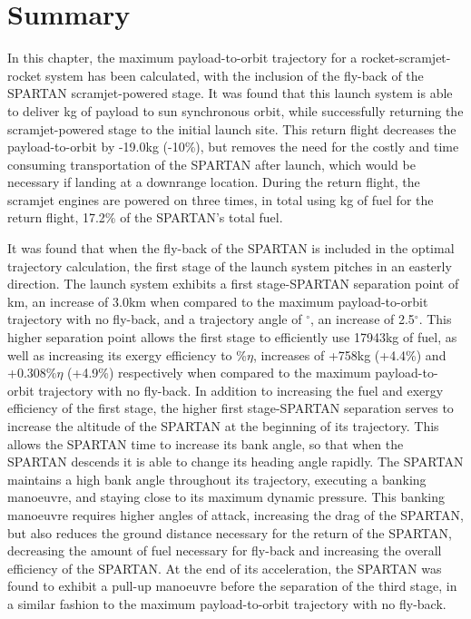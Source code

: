 \section{Summary}

In this chapter, the maximum payload-to-orbit trajectory for a rocket-scramjet-rocket system has been calculated, with the inclusion of the fly-back of the SPARTAN scramjet-powered stage. It was found that this launch system is able to deliver \PayloadToOrbitStandard kg of payload to sun synchronous orbit, while successfully returning the scramjet-powered stage to the initial launch site. 
This return flight decreases the payload-to-orbit by -19.0kg (-10\%), but removes the need for the costly and time consuming transportation of the SPARTAN after launch, which would be necessary if landing at a downrange location.
During the return flight, the scramjet engines are powered on three times, in total using \returnFuelStandard kg of fuel for the return flight, 17.2\% of the SPARTAN's total fuel.

It was found that when the fly-back of the SPARTAN is included in the optimal trajectory calculation, the first stage of the launch system pitches in an easterly direction. 
The launch system exhibits a first stage-SPARTAN separation point of \firstsecondSeparationAltStandard km, an increase of 3.0km when compared to the maximum payload-to-orbit trajectory with no fly-back, and a trajectory angle of \firstsecondSeparationgammaStandard $^\circ$, an increase of 2.5$^\circ$. 
This higher separation point allows the first stage to efficiently use 17943kg of fuel, as well as increasing its exergy efficiency to \firstExergyEffStandard \%$\eta$, increases of +758kg (+4.4\%) and +0.308\%$\eta$ (+4.9\%) respectively when compared to the maximum payload-to-orbit trajectory with no fly-back.
In addition to increasing the fuel and exergy efficiency of the first stage, the higher first stage-SPARTAN separation serves to increase the altitude of the SPARTAN at the beginning of its trajectory. This allows the SPARTAN time to increase its bank angle, so that when the SPARTAN descends it is able to change its heading angle rapidly. The SPARTAN maintains a high bank angle throughout its trajectory, executing a banking manoeuvre, and staying close to its maximum dynamic pressure. 
This banking manoeuvre requires higher angles of attack, increasing the drag of the SPARTAN, but also reduces the ground distance necessary for the return of the SPARTAN, decreasing the amount of fuel necessary for fly-back and increasing the overall efficiency of the SPARTAN. 
At the end of its acceleration, the SPARTAN was found to exhibit a pull-up manoeuvre before the separation of the third stage, in a similar fashion to the maximum payload-to-orbit trajectory with no fly-back. 

